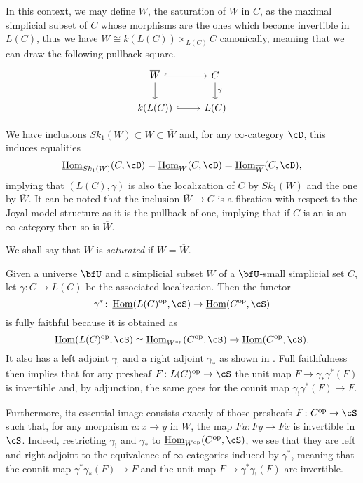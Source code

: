 \begin{rmk}\label{715}

  In this context, we may define $\overline{W}$, the saturation of $W$ in $C$,
  as the maximal simplicial subset of $C$
  whose morphisms are the ones which become invertible in $L(C)$, thus we have
  $\overline{W}\cong k(L(C))\times_{L(C)}C$ canonically, meaning that we can
  draw the following pullback square.
  \[\begin{tikzcd}
    {\overline{W}} & C \\
    {k(L(C))} & {L(C)}
    \arrow[hook, from=2-1, to=2-2]
    \arrow["\gamma", from=1-2, to=2-2]
    \arrow[hook, from=1-1, to=1-2]
    \arrow[from=1-1, to=2-1]
  \end{tikzcd}\]

  \noindent
  We have inclusions $Sk_1(W)\subset W\subset\overline{W}$ and, for any
  $\infty$-category $\cD$, this induces equalities
  \[\home_{Sk_1(W)}(C,\cD)=\home_{W}(C,\cD)=\home_{\overline{W}}(C,\cD),\]
  implying that $(L(C),\gamma)$ is also the localization of $C$ by $Sk_1(W)$
  and the one by $\overline{W}$. It can be noted that the inclusion
  $\overline{W}\rightarrow C$ is a fibration with respect to the Joyal model
  structure as it is the pullback of one, implying that if $C$ is an is an
  $\infty$-category then so is $\overline{W}$.

  \noindent
  We shall say that $W$ is \emph{saturated} if $W=\overline{W}$.
\end{rmk}

\begin{rmk}

  Given a universe $\bfU$ and a simplicial subset $W$ of a $\bfU$-small
  simplicial set $C$, let $\gamma\colon C\rightarrow L(C)$ be the
  associated localization. Then the functor
  $$\gamma^*\colon\home(L(C)^{\op},\cS)\rightarrow\home(C^{\op},\cS)$$ is
  fully faithful because it is obtained as
  \[\home(L(C)^{\op},\cS)\simeq\home_{W^{\op}}(C^{\op},\cS)\rightarrow\home(C^{\op},\cS).\]
  It also has a left adjoint $\gamma_!$ and a right adjoint $\gamma_*$ as
  shown in \cite[Ch.\ 6]{Cis19}. Full faithfulness then implies that for any
  presheaf $F\colon L(C)^{\op}\rightarrow\cS$ the unit map
  $F\rightarrow\gamma_*\gamma^*(F)$ is invertible and, by adjunction, the same
  goes for the counit map $\gamma_!\gamma^*(F)\rightarrow F$.

  \noindent
  Furthermore, its essential image consists exactly of those presheafs $F\colon
  C^{\op}\rightarrow\cS$ such that, for any morphism $u\colon x\rightarrow y$ in
  $W$, the map $Fu\colon Fy\rightarrow Fx$ is invertible in $\cS$. Indeed,
  restricting
  $\gamma_!$ and $\gamma_*$ to $\home_{W^{\op}}(C^{\op},\cS)$, we see that they
  are left and right adjoint to the equivalence of $\infty$-categories induced
  by $\gamma^*$, meaning that the counit map $\gamma^*\gamma_*(F)\rightarrow F$
  and the unit map $F\rightarrow\gamma^*\gamma_!(F)$ are invertible.
\end{rmk}

